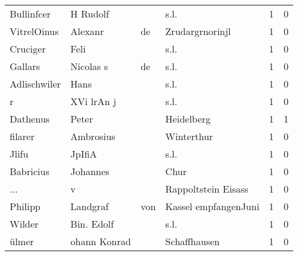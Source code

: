 \begin{tabular}{llllrr}
               Bullinfcer &                           H Rudolf &             &                                        s.l. &          1 &         0 \\
              VitrelOinus &                            Alexanr &          de &                             Zrudargrnorinjl &          1 &         0 \\
                 Cruciger &                               Feli &             &                                        s.l. &          1 &         0 \\
                  Gallars &                          Nicolas s &          de &                                        s.l. &          1 &         0 \\
             Adlischwiler &                               Hans &             &                                        s.l. &          1 &         0 \\
                        r &                         XVi lrAn j &             &                                        s.l. &          1 &         0 \\
                 Dathenus &                              Peter &             &                                  Heidelberg &          1 &         1 \\
                  filarer &                          Ambrosius &             &                                  Winterthur &          1 &         0 \\
                    Jlifu &                             JpIfiA &             &                                        s.l. &          1 &         0 \\
                Babricius &                           Johannes &             &                                        Chur &          1 &         0 \\
                      ... &                                  v &             &                         Rappoltstein Eisass &          1 &         0 \\
                  Philipp &                           Landgraf &         von &                        Kassel empfangenJuni &          1 &         0 \\
                   Wilder &                         Bin. Edolf &             &                                        s.l. &          1 &         0 \\
                    ülmer &                       ohann Konrad &             &                                Schaffhausen &          1 &         0 \\

\end{tabular}
